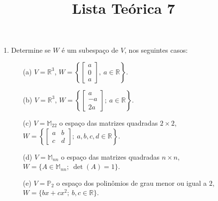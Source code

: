 \documentclass[a4paper,12pt]{article}
\title{Lista Teórica 7}
\author{}
\date{}
\begin{document}
\maketitle

\begin{enumerate}
\item Determine se $W$ é um subespaço de $V$, nos seguintes casos:

\begin{enumerate}
    \item[(a)] $V = \mathbb{R}^3$, $W = \left\{ \begin{bmatrix} a \\ 0 \\ a \end{bmatrix} ,\ a \in \mathbb{R} \right\}$.
    \item[(b)] $V = \mathbb{R}^3$, $W = \left\{ \begin{bmatrix} a \\ -a \\ 2a \end{bmatrix} ;\ a \in \mathbb{R} \right\}$.
    \item[(c)] $V = \mathbb{M}_{22}$ o espaço das matrizes quadradas $2 \times 2$, $W = \left\{ \begin{bmatrix} a & b \\ c & d \end{bmatrix} ;\ a, b, c, d \in \mathbb{R} \right\}$.
    \item[(d)] $V = \mathbb{M}_{nn}$ o espaço das matrizes quadradas $n \times n$, $W = \{A \in \mathbb{M}_{nn};\ \det(A) = 1\}$.
    \item[(e)] $V = \mathbb{P}_2$ o espaço dos polinômios de grau menor ou igual a $2$, $W = \{bx + cx^2;\ b, c \in \mathbb{R}\}$.
\end{enumerate}


\end{enumerate}
\end{document}
